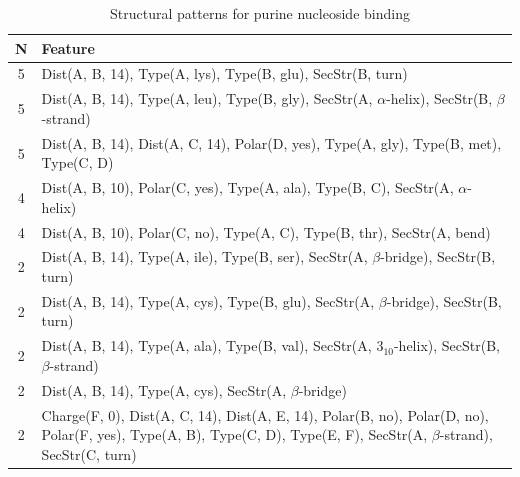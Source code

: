\documentclass[11pt,twoside,a4paper]{book}
\begin{document}
\begin{table}\begin{tabularx}{\textwidth}{cX}\textbf{N} & \textbf{Feature} \\ \hline  
5 & Dist(A, B, 14),  Type(A, lys), Type(B, glu), SecStr(B, turn)\\ \hline 
5 & Dist(A, B, 14),  Type(A, leu), Type(B, gly), SecStr(A, $\alpha$-helix), SecStr(B, $\beta$-strand)\\ \hline 
5 & Dist(A, B, 14), Dist(A, C, 14), Polar(D, yes),  Type(A, gly), Type(B, met), \newline Type(C, D)\\ \hline 
4 & Dist(A, B, 10), Polar(C, yes),  Type(A, ala), Type(B, C), SecStr(A, $\alpha$-helix)\\ \hline 
4 & Dist(A, B, 10), Polar(C, no),  Type(A, C), Type(B, thr), SecStr(A, bend)\\ \hline 
2 & Dist(A, B, 14),  Type(A, ile), Type(B, ser), SecStr(A, $\beta$-bridge), SecStr(B, turn)\\ \hline 
2 & Dist(A, B, 14),  Type(A, cys), Type(B, glu), SecStr(A, $\beta$-bridge), SecStr(B, turn)\\ \hline 
2 & Dist(A, B, 14),  Type(A, ala), Type(B, val), SecStr(A, $3_{10}$-helix), SecStr(B, $\beta$-strand)\\ \hline 
2 & Dist(A, B, 14),   Type(A, cys), SecStr(A, $\beta$-bridge)\\ \hline 
2 & Charge(F, 0), Dist(A, C, 14), Dist(A, E, 14), Polar(B, no), Polar(D, no), \newline Polar(F, yes),  Type(A, B), Type(C, D), Type(E, F), SecStr(A, $\beta$-strand), \newline SecStr(C, turn)\\ \hline 
 \end{tabularx}\caption{Structural patterns for purine nucleoside binding}\label{tab:purine_nucleoside_binding}\end{table}
\end{document}
